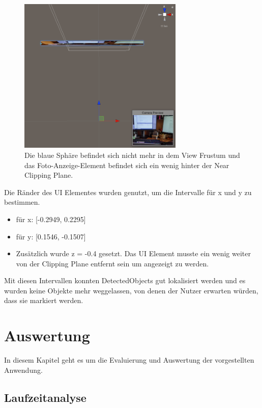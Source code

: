 \begin{figure}[H]
	\centering
	\includegraphics[width=0.7\textwidth]{images/canvasinyourfaceTopDown.PNG}
	\caption[Tiefe des Foto-Anzeige-Elements finden]{Die blaue Sphäre befindet sich nicht mehr in dem View Frustum und das Foto-Anzeige-Element befindet sich ein wenig hinter der Near Clipping Plane.}
	\label{illustration:canvasinsourfacetodown}
\end{figure}

Die Ränder des UI Elementes wurden genutzt, um die Intervalle für x und y zu bestimmen.
\begin{itemize}
	\item für x: [-0.2949, 0.2295]
	\item für y: [0.1546, -0.1507]
	\item Zusätzlich wurde z = -0.4 gesetzt. Das UI Element musste ein wenig weiter von der Clipping Plane entfernt sein um angezeigt zu werden.
\end{itemize}

Mit diesen Intervallen konnten DetectedObjects gut lokalisiert werden und es wurden keine Objekte mehr weggelassen, von denen der Nutzer erwarten würden, dass sie markiert werden.

\newpage
\section{Auswertung}

In diesem Kapitel geht es um die Evaluierung und Auswertung der vorgestellten Anwendung.

\subsection{Laufzeitanalyse}

